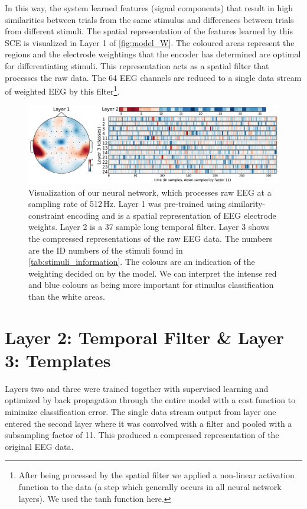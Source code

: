 In this way, the system learned features (signal components) that result in high similarities between trials from the same stimulus and differences between trials from different stimuli.  
The spatial representation of the features learned by this \ac{SCE} is visualized in Layer 1 of \autoref{fig:model_W}. 
The coloured areas represent the regions and the electrode weightings that the encoder has determined are optimal for differentiating stimuli.
This representation acts as a spatial filter that processes the raw data.
The 64 EEG channels are reduced to a single data stream of weighted EEG by this filter\footnote{After being processed by the spatial filter we applied a non-linear activation function to the data (a step which generally occurs in all neural network layers).
We used the tanh function here.}. 
\begin{figure}[h] 
  \begin{center}
    \includegraphics[width=\textwidth,keepaspectratio=true]{Figures/model_W}
    \caption{Visualization of our neural network, which processes raw EEG at a sampling rate of 512\,Hz.
    Layer 1 was pre-trained using similarity-constraint encoding and is a spatial representation of EEG electrode weights. Layer 2 is a 37 sample long temporal filter. Layer 3 shows the compressed representations of the raw EEG data. The numbers are the ID numbers of the stimuli found in \autoref{tab:stimuli_information}. The colours are an indication of the weighting decided on by the model. We can interpret the intense red and blue colours as being more important for stimulus classification than the white areas.}
    \label{fig:model_W}
  \end{center}
\end{figure}
\section{Layer 2: Temporal Filter \& Layer 3: Templates}
Layers two and three were trained together with supervised learning and optimized by back propagation through the entire model with a cost function to minimize classification error.
The single data stream output from layer one entered the second layer where it was convolved with a filter and pooled with a subsampling factor of 11.
This produced a compressed representation of the original EEG data.

